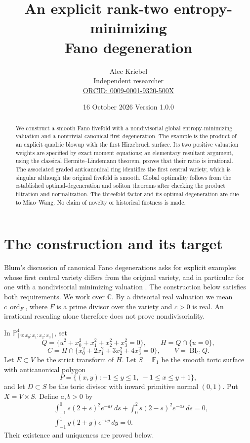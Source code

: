\documentclass[11pt,a4paper]{article}
\title{An explicit rank-two entropy-minimizing\\ Fano degeneration}
\author{Alec Kriebel\\{\small Independent researcher}\\
{\small\href{https://orcid.org/0009-0001-9320-500X}{ORCID: 0009-0001-9320-500X}}}
\date{16 October 2026 \quad Version 1.0.0}
\newcommand{\C}{\mathbb C}
\newcommand{\ord}{\operatorname{ord}}
\newcommand{\Bl}{\operatorname{Bl}}
\begin{document}
\maketitle
\begin{abstract}
We construct a smooth Fano fivefold with a nondivisorial global
entropy-minimizing valuation and a nontrivial canonical first degeneration.
The example is the product of an explicit quadric blowup with the first
Hirzebruch surface. Its two positive valuation weights are specified by exact
moment equations; an elementary resultant argument, using the classical
Hermite--Lindemann theorem, proves that their ratio is irrational.
The associated graded anticanonical ring identifies the first central
variety, which is singular although the original fivefold is smooth.
Global optimality follows from the established optimal-degeneration and
soliton theorems after checking the product filtration and normalization.
The threefold factor and its optimal degeneration are due to Miao--Wang.
No claim of novelty or historical firstness is made.
\end{abstract}

\section{The construction and its target}

Blum's discussion of canonical Fano degenerations asks for explicit examples
whose first central variety differs from the original variety, and in
particular for one with a nondivisorial minimizing valuation
\cite[pp.~888--889]{OWR}. The construction below satisfies both requirements.
We work over \(\C\). By a divisorial real valuation we mean
\(c\,\ord_F\), where \(F\) is a prime divisor over the variety and \(c>0\)
is real. An irrational rescaling alone therefore does not prove
nondivisoriality.

In \(\mathbb P^4_{[u:x_0:x_1:x_2:x_3]}\), set
\[
 Q=\{u^2+x_0^2+x_1^2+x_2^2+x_3^2=0\},\qquad H=Q\cap\{u=0\},
\]
\[
 C=H\cap\{x_0^2+2x_1^2+3x_2^2+4x_3^2=0\},\qquad V=\Bl_C Q.
\]
Let \(E\subset V\) be the strict transform of \(H\). Let \(S=\mathbb F_1\)
be the smooth toric surface with anticanonical polygon
\[
 P=\{(x,y):-1\leq y\leq1,\ -1\leq x\leq y+1\},
\]
and let \(D\subset S\) be the toric divisor with inward primitive normal
\((0,1)\). Put \(X=V\times S\).
Define \(a,b>0\) by
\begin{align}
 &\int_{-1}^0 s(2+s)^2e^{-as}\,ds+
             \int_0^2 s(2-s)^2e^{-as}\,ds=0, \label{eq:a}\\
 &\int_{-1}^1 y(2+y)e^{-by}\,dy=0. \label{eq:b}
\end{align}
Their existence and uniqueness are proved below.
\end{document}
